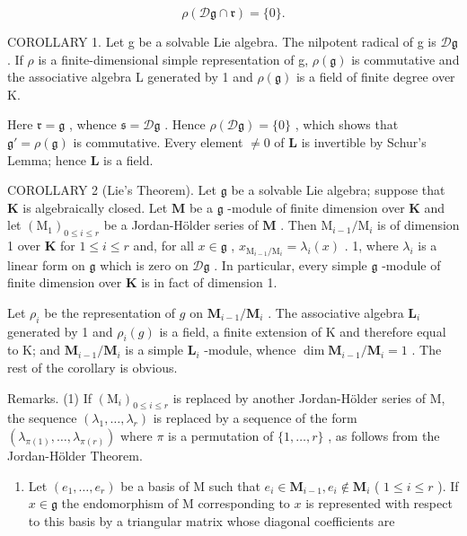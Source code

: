 \[
\rho (\mathcal{D}\mathfrak{g} \cap \mathfrak{r}) = \{0 \}.
\]

COROLLARY 1. Let g be a solvable Lie algebra. The nilpotent radical of g is \(\mathcal{D}\mathfrak{g}\) . If \(\rho\) is a finite-dimensional simple representation of g, \(\rho(\mathfrak{g})\) is commutative and the associative algebra L generated by 1 and \(\rho(\mathfrak{g})\) is a field of finite degree over K.

Here \(\mathfrak{r} = \mathfrak{g}\) , whence \(\mathfrak{s} = \mathcal{D}\mathfrak{g}\) . Hence \(\rho(\mathcal{D}\mathfrak{g}) = \{0\}\) , which shows that \(\mathfrak{g}' = \rho(\mathfrak{g})\) is commutative. Every element \(\neq 0\) of \(\mathbf{L}\) is invertible by Schur's Lemma; hence \(\mathbf{L}\) is a field.

COROLLARY 2 (Lie's Theorem). Let \(\mathfrak{g}\) be a solvable Lie algebra; suppose that \(\mathbf{K}\) is algebraically closed. Let \(\mathbf{M}\) be a \(\mathfrak{g}\) -module of finite dimension over \(\mathbf{K}\) and let \((\mathrm{M}_1)_{0 \leqslant i \leqslant r}\) be a Jordan-Hölder series of \(\mathbf{M}\) . Then \(\mathrm{M}_{i - 1} / \mathrm{M}_i\) is of dimension 1 over \(\mathbf{K}\) for \(1 \leqslant i \leqslant r\) and, for all \(x \in \mathfrak{g}\) , \(x_{\mathrm{M}_{i - 1} / \mathrm{M}_i} = \lambda_i(x)\) . 1, where \(\lambda_i\) is a linear form on \(\mathfrak{g}\) which is zero on \(\mathcal{D}\mathfrak{g}\) . In particular, every simple \(\mathfrak{g}\) -module of finite dimension over \(\mathbf{K}\) is in fact of dimension 1.

Let \(\rho_{i}\) be the representation of \(g\) on \(\mathbf{M}_{i-1}/\mathbf{M}_{i}\) . The associative algebra \(\mathbf{L}_{i}\) generated by 1 and \(\rho_{i}(g)\) is a field, a finite extension of K and therefore equal to K; and \(\mathbf{M}_{i-1}/\mathbf{M}_{i}\) is a simple \(\mathbf{L}_{i}\) -module, whence \(\dim \mathbf{M}_{i-1}/\mathbf{M}_{i} = 1\) . The rest of the corollary is obvious.

Remarks. (1) If \((\mathrm{M}_i)_{0\leqslant i\leqslant r}\) is replaced by another Jordan-Hölder series of M, the sequence \((\lambda_1,\dots ,\lambda_r)\) is replaced by a sequence of the form \((\lambda_{\pi (1)},\dots ,\lambda_{\pi (r)})\) where \(\pi\) is a permutation of \(\{1,\dots ,r\}\) , as follows from the Jordan-Hölder Theorem.

\begin{enumerate}
\def\labelenumi{(\arabic{enumi})}
\setcounter{enumi}{1}
\tightlist
\item
  Let \((e_1, \ldots, e_r)\) be a basis of M such that \(e_i \in \mathbf{M}_{i-1}, e_i \notin \mathbf{M}_i\) ( \(1 \leqslant i \leqslant r\) ). If \(x \in \mathfrak{g}\) the endomorphism of M corresponding to \(x\) is represented with respect to this basis by a triangular matrix whose diagonal coefficients are
\end{enumerate}

